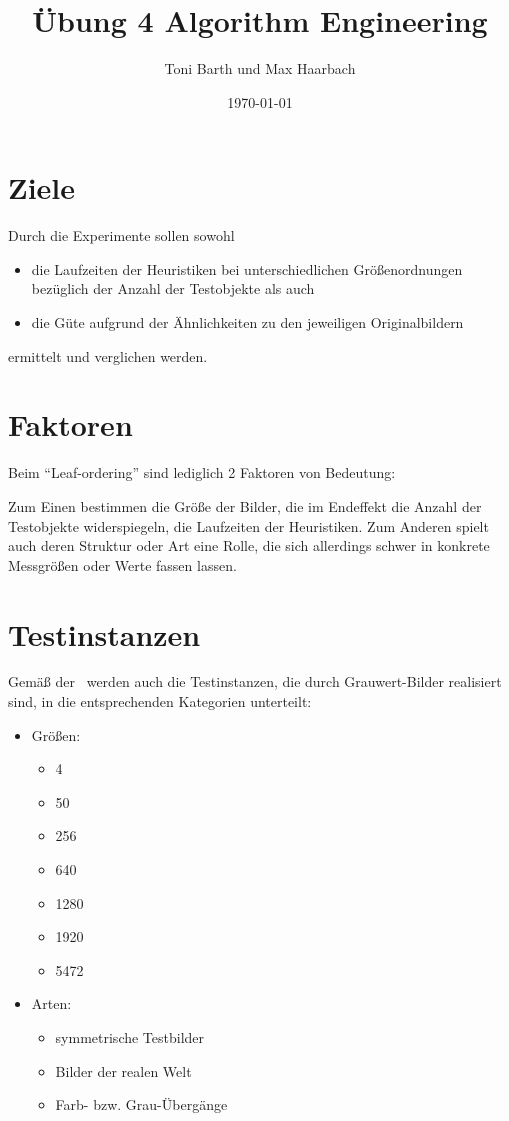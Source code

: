 \documentclass[a4paper, 10pt, twoside, onecolumn, parskip]{scrartcl}
\title{Übung 4 Algorithm Engineering} %
\author{{Toni Barth} und {Max Haarbach}} %
\date{\today}			%
\begin{document}
    \maketitle				%

    \section{Ziele} \label{sec:ziele}

    Durch die Experimente sollen sowohl
    \begin{itemize}
        \item die Laufzeiten der Heuristiken bei unterschiedlichen Größenordnungen bezüglich der Anzahl der Testobjekte als auch
        \item die Güte aufgrund der Ähnlichkeiten zu den jeweiligen Originalbildern
    \end{itemize}
    ermittelt und verglichen werden.

    \section{Faktoren} \label{sec:faktoren}

    Beim \enquote{Leaf-ordering} sind lediglich 2 Faktoren von Bedeutung:

    Zum Einen bestimmen die Größe der Bilder, die im Endeffekt die Anzahl der Testobjekte widerspiegeln, die Laufzeiten der Heuristiken.
    Zum Anderen spielt auch deren Struktur oder Art eine Rolle, die sich allerdings schwer in konkrete Messgrößen oder Werte fassen lassen.

    \section{Testinstanzen} \label{sec:testinstanzen}

    Gemäß der~ werden auch die Testinstanzen, die durch Grauwert-Bilder realisiert sind, in die entsprechenden Kategorien unterteilt:
    \begin{itemize}
        \item Größen:
        \begin{itemize}
            \item 4
            \item 50
            \item 256
            \item 640
            \item 1280
            \item 1920
            \item 5472
        \end{itemize}

        \item Arten:
        \begin{itemize}
            \item symmetrische Testbilder
            \item Bilder der realen Welt
            \item Farb- bzw. Grau-Übergänge
        \end{itemize}
    \end{itemize}
\end{document}
